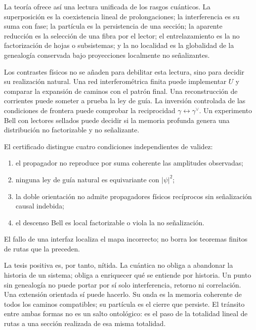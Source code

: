 La teoría ofrece así una lectura unificada de los rasgos cuánticos. La
superposición es la coexistencia lineal de prolongaciones; la interferencia es su
suma con fase; la partícula es la persistencia de una sección; la aparente reducción
es la selección de una fibra por el lector; el entrelazamiento es la no
factorización de hojas o subsistemas; y la no localidad es la globalidad de la
genealogía conservada bajo proyecciones localmente no señalizantes.

Los contrastes físicos no se añaden para debilitar esta lectura, sino para decidir
su realización natural. Una red interferométrica finita puede implementar \(U\) y
comparar la expansión de caminos con el patrón final. Una reconstrucción de
corrientes puede someter a prueba la ley de guía. La inversión controlada de las
condiciones de frontera puede comprobar la reciprocidad
\(\gamma\leftrightarrow\gamma^\vee\). Un experimento Bell con lectores sellados
puede decidir si la memoria profunda genera una distribución no factorizable y no
señalizante.

\begin{test}
El certificado distingue cuatro condiciones independientes de validez:
\begin{enumerate}
  \item el propagador no reproduce por suma coherente las amplitudes observadas;
  \item ninguna ley de guía natural es equivariante con \(|\psi|^2\);
  \item la doble orientación no admite propagadores físicos recíprocos sin
  señalización causal indebida;
  \item el descenso Bell es local factorizable o viola la no señalización.
\end{enumerate}
El fallo de una interfaz localiza el mapa incorrecto; no borra los teoremas finitos
de rutas que la preceden.
\end{test}

La tesis positiva es, por tanto, nítida. La cuántica no obliga a abandonar la
historia de un sistema; obliga a enriquecer qué se entiende por historia. Un punto
sin genealogía no puede portar por sí solo interferencia, retorno ni correlación.
Una extensión orientada sí puede hacerlo. Su onda es la memoria coherente de todos
los caminos compatibles; su partícula es el cierre que persiste. El tránsito entre
ambas formas no es un salto ontológico: es el paso de la totalidad lineal de rutas a
una sección realizada de esa misma totalidad.

